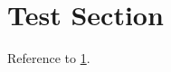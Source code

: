 \documentclass[oneside]{tongjithesis}
\begin{document}
\section{Test Section}\label{sec:test}
Reference to \cref{sec:test}.
\end{document}
